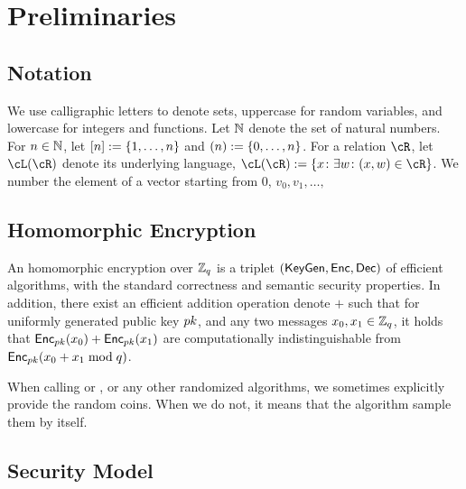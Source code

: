 \section{Preliminaries}\label{sec:Preliminaries}

\subsection{Notation} 
We use calligraphic letters to denote sets, uppercase for random variables, and lowercase for integers and functions. %
Let ${\mathbb{N}}$ denote the set of natural numbers.  For $n\in {\mathbb{N}}$, let $[n] \eqdef \set{1,\ldots,n}$ and $(n) \eqdef \set{0,\ldots,n}$.  For a relation $\cR$, let $\cL(\cR)$ denote its underlying language, \ie  $\cL(\cR) \eqdef \set{x\colon \exists w \colon (x,w) \in \cR}$.    We number the element of a vector starting from $0$, \ie $v_0,v_1,
\ldots,$


\subsection{Homomorphic Encryption}
An homomorphic encryption over ${\mathbb Z}_q$ is a triplet $(\mathsf{KeyGen},\mathsf{Enc},\mathsf{Dec})$ of efficient algorithms, with the standard correctness and semantic security properties.  In addition, there exist an efficient  addition operation denote $+$  such that for uniformly  generated public key  ${pk}$, and any two  messages $x_0,x_1\in {\mathbb Z}_q$,  it holds that  $\mathsf{Enc}_{pk}(x_0) + \mathsf{Enc}_{pk}(x_1) $ are computationally indistinguishable from $\mathsf{Enc}_{pk}(x_0+ x_1 \bmod q)$.



\begin{remark}
When calling  \KeyGen or \Enc, or any other randomized algorithms,  we sometimes explicitly provide the random coins. When we do not, it means that the algorithm sample them by itself. 
\end{remark}


\subsection{Security Model}



